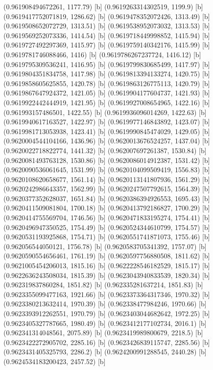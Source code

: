 {{{(0.961908494672261, 1177.79) [b] 
(0.9619263314302519, 1199.9) [b] 
(0.9619417752071819, 1286.62) [b] 
(0.9619478352072426, 1313.49) [b] 
(0.9619508652072729, 1313.51) [b] 
(0.9619538952073032, 1313.53) [b] 
(0.9619569252073336, 1414.54) [b] 
(0.9619718449998852, 1415.94) [b] 
(0.9619727492297369, 1415.97) [b] 
(0.9619759140342176, 1415.99) [b] 
(0.9619781746088466, 1416) [b] 
(0.9619786267237724, 1416.12) [b] 
(0.9619795309536241, 1416.95) [b] 
(0.9619799830685499, 1417.97) [b] 
(0.9619804351834758, 1417.98) [b] 
(0.9619813394133274, 1420.75) [b] 
(0.9619858605625855, 1420.78) [b] 
(0.9619863126775113, 1420.79) [b] 
(0.9619867647924372, 1421.05) [b] 
(0.9619904177604737, 1421.93) [b] 
(0.9619922442444919, 1421.95) [b] 
(0.9619927008654965, 1422.16) [b] 
(0.961993157486501, 1422.55) [b] 
(0.9619936096014269, 1422.63) [b] 
(0.9619940617163527, 1422.97) [b] 
(0.9619977146843892, 1423.07) [b] 
(0.9619981713053938, 1423.41) [b] 
(0.9619990845474029, 1429.05) [b] 
(0.9620004544104166, 1436.96) [b] 
(0.9620013676524257, 1437.04) [b] 
(0.9620022718822774, 1441.32) [b] 
(0.962007697261387, 1530.84) [b] 
(0.9620081493763128, 1530.86) [b] 
(0.9620086014912387, 1531.42) [b] 
(0.9620090536061645, 1531.99) [b] 
(0.9620104099509419, 1556.83) [b] 
(0.9620108620658677, 1561.14) [b] 
(0.9620113141807936, 1561.29) [b] 
(0.9620242986643357, 1562.99) [b] 
(0.9620247507792615, 1564.39) [b] 
(0.9620377352628037, 1651.84) [b] 
(0.9620386394926553, 1695.43) [b] 
(0.9620411509081804, 1700.18) [b] 
(0.9620413792186827, 1700.29) [b] 
(0.9620414755569704, 1746.56) [b] 
(0.9620471833195274, 1754.41) [b] 
(0.9620496947350525, 1754.49) [b] 
(0.9620524344610799, 1754.57) [b] 
(0.9620531193925868, 1754.71) [b] 
(0.9620551741871073, 1755.46) [b] 
(0.962056544050121, 1756.78) [b] 
(0.9620583705341392, 1757.07) [b] 
(0.9620590554656461, 1761.19) [b] 
(0.9620597756880508, 1811.62) [b] 
(0.9621005454206013, 1815.16) [b] 
(0.9622228546182529, 1815.17) [b] 
(0.9622636243508034, 1815.39) [b] 
(0.9623043940833539, 1820.34) [b] 
(0.962319837860284, 1851.82) [b] 
(0.962335281637214, 1851.83) [b] 
(0.9623355099477163, 1921.66) [b] 
(0.9623373364317346, 1970.32) [b] 
(0.9623380213632414, 1970.39) [b] 
(0.962338477984246, 1970.66) [b] 
(0.9623393912262551, 1970.79) [b] 
(0.9623403044682642, 1972.25) [b] 
(0.9623405327787665, 1980.49) [b] 
(0.9623412177102734, 2016.1) [b] 
(0.962341314048561, 2075.89) [b] 
(0.9623419989800679, 2218.5) [b] 
(0.9623422272905702, 2285.16) [b] 
(0.9623426839115747, 2285.56) [b] 
(0.9623431405325793, 2286.2) [b] 
(0.9624200991288545, 2440.28) [b] 
(0.9624534183200423, 2457.52) [b] 
}}}
